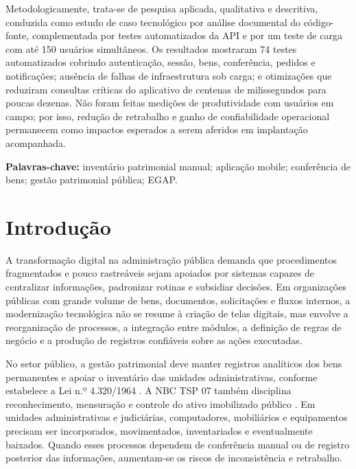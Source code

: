 \documentclass[12pt,a4paper]{article}
\begin{document}
Metodologicamente, trata-se de pesquisa aplicada, qualitativa e descritiva, conduzida como estudo de caso tecnológico por análise documental do código-fonte, complementada por testes automatizados da API e por um teste de carga com até 150 usuários simultâneos. Os resultados mostraram 74 testes automatizados cobrindo autenticação, sessão, bens, conferência, pedidos e notificações; ausência de falhas de infraestrutura sob carga; e otimizações que reduziram consultas críticas do aplicativo de centenas de milissegundos para poucas dezenas. Não foram feitas medições de produtividade com usuários em campo; por isso, redução de retrabalho e ganho de confiabilidade operacional permanecem como impactos esperados a serem aferidos em implantação acompanhada.

\noindent\textbf{Palavras-chave:} inventário patrimonial manual; aplicação mobile; conferência de bens; gestão patrimonial pública; EGAP.

\clearpage
\listoftables
\clearpage
\renewcommand{\contentsname}{SUMÁRIO}
\begingroup
\singlespacing
\tableofcontents
\endgroup
\clearpage
{}

\section{Introdução}

A transformação digital na administração pública demanda que procedimentos fragmentados e pouco rastreáveis sejam apoiados por sistemas capazes de centralizar informações, padronizar rotinas e subsidiar decisões. Em organizações públicas com grande volume de bens, documentos, solicitações e fluxos internos, a modernização tecnológica não se resume à criação de telas digitais, mas envolve a reorganização de processos, a integração entre módulos, a definição de regras de negócio e a produção de registros confiáveis sobre as ações executadas.

No setor público, a gestão patrimonial deve manter registros analíticos dos bens permanentes e apoiar o inventário das unidades administrativas, conforme estabelece a Lei n.º 4.320/1964 \cite{brasil4320}. A NBC TSP 07 também disciplina reconhecimento, mensuração e controle do ativo imobilizado público \cite{cfcnbctsp07}. Em unidades administrativas e judiciárias, computadores, mobiliários e equipamentos precisam ser incorporados, movimentados, inventariados e eventualmente baixados. Quando esses processos dependem de conferência manual ou de registro posterior das informações, aumentam-se os riscos de inconsistência e retrabalho.
\end{document}
